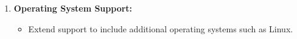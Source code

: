 \begin{enumerate}

    \item \textbf{Operating System Support:}
          \begin{itemize}
              \item Extend support to include additional operating systems such as Linux.
          \end{itemize}

\end{enumerate}